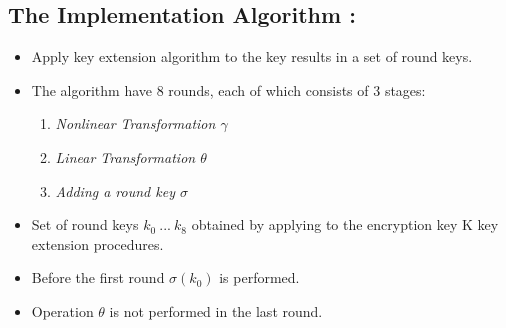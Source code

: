 \documentclass[preprint]{transcrypto}
\begin{document}
\subsection{The Implementation Algorithm : }
\begin{itemize}
    \item  Apply key extension algorithm to the key results in a set of round keys.
    \item The algorithm have 8 rounds, each of which consists of 3 stages:
    \begin{enumerate}
        \item \textit{Nonlinear Transformation $\gamma$} 
        \item \textit{Linear Transformation $\theta$ }
        \item \textit{Adding a round key $\sigma$}
    \end{enumerate}
    \item Set of round keys  $k_{0} \ . . . \ k_{8}$ obtained by applying to the encryption key K key extension procedures.
    \item Before the first round $\sigma(k_0)$ is performed.
    \item Operation $\theta$  is not performed in the last round.
\end{itemize} 
\end{document}

